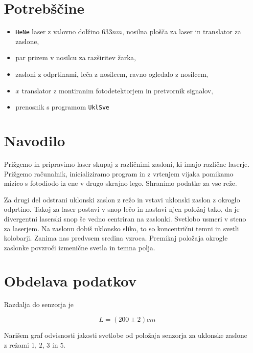 \documentclass[12pt]{report}
\begin{document}
\begingroup
\let\clearpage\relax

\chapter*{Potrebščine}
\begin{itemize}
\item \verb+HeNe+ laser z valovno dolžino $633 \si{nm}$, nosilna plošča za laser in translator za zaslone, 
\item par prizem v nosilcu za razširitev žarka, 
\item zasloni z odprtinami, leča z nosilcem, ravno ogledalo z nosilcem, 
\item $x$ translator z montiranim fotodetektorjem in pretvornik signalov, 
\item prenosnik s programom \verb+UklSve+
\end{itemize}

\chapter*{Navodilo}

Prižgemo in pripravimo laser skupaj z različnimi zasloni, ki imajo različne laserje. Prižgemo računalnik, inicializiramo program in z vrtenjem vijaka pomikamo mizico s fotodiodo iz ene v drugo skrajno lego. Shranimo podatke za vse reže. 

Za drugi del odstrani uklonski zaslon z režo in vstavi uklonski zaslon z okroglo odprtino. Takoj za laser postavi v snop lečo in nastavi njen položaj tako, da je divergentni laserski snop še vedno centriran na zaslonki. Svetlobo usmeri v steno za laserjem. Na zaslonu dobiš uklonsko sliko, to so koncentrični temni in svetli kolobarji. Zanima nas predvsem sredina vzroca. Premikaj položaja okrogle zaslonke povzroči izmenične svetla in temna polja. 

\endgroup


\chapter*{Obdelava podatkov}

Razdalja do senzorja je 

\[
L = (200 \pm 2)\si{cm}  
\]

Narišem graf odvisnosti jakosti svetlobe od položaja senzorja za uklonske zaslone z režami 1, 2, 3 in 5. 
\end{document}
